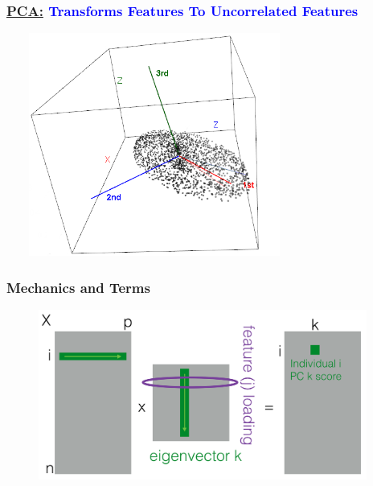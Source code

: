 \documentclass[xcolor={dvipsnames}]{beamer}
\begin{document}
\frame
{
 \frametitle{\underline{PCA:} \textcolor{blue}{\textbf{Transforms Features To Uncorrelated Features}}}

$\quad\quad$\includegraphics[width=3.25in, angle=-5]{stuff/WgiUk.png}

}


\frame
{
 \frametitle{Mechanics and Terms}
 
 \begin{figure}
 \centering
\includegraphics[width=4.25in]{stuff/PCAaa.png} 
\end{figure}

}
\end{document}

